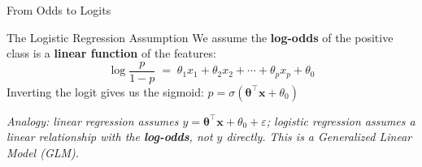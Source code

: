 \documentclass[aspectratio=169,11pt]{beamer}
\begin{document}
\begin{frame}{From Odds to Logits}
\begin{center}
\end{center}

\vspace{0.5em}
\begin{block}{The Logistic Regression Assumption}
We assume the \textbf{log-odds} of the positive class is a \textbf{linear function} of the features:
\[
  \log\frac{p}{1-p} \;=\; \theta_1 x_1 + \theta_2 x_2 + \cdots + \theta_p x_p + \theta_0
\]
Inverting the logit gives us the sigmoid: \quad $p = \sigma(\boldsymbol{\theta}^\top\boldsymbol{x}+\theta_0)$
\end{block}

\smallskip
\footnotesize\textit{Analogy: linear regression assumes $y = \boldsymbol{\theta}^\top\boldsymbol{x}+\theta_0+\varepsilon$; logistic regression assumes a linear relationship with the \textbf{log-odds}, not $y$ directly. This is a Generalized Linear Model (GLM).}
\end{frame}
\end{document}
